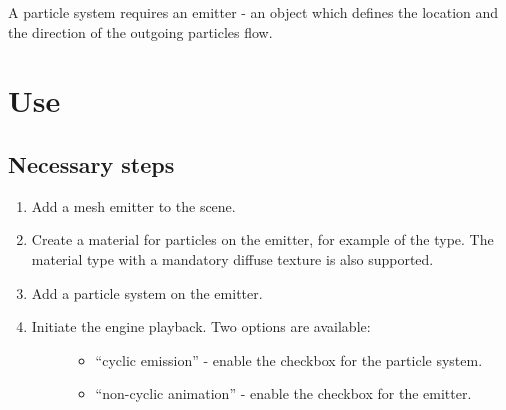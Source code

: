 \documentclass[a4paper,12pt,oneside]{sphinxmanual}
\begin{document}
A particle system requires an emitter - an object which defines the location and the direction of the outgoing particles flow.


\section{Use}
\label{particles:id2}

\subsection{Necessary steps}
\label{particles:id3}\begin{enumerate}
\item {} 
Add a mesh emitter to the scene.

\item {} 
Create a material for particles on the emitter, for example of the  type. The  material type with a mandatory diffuse texture is also supported.

\item {} 
Add a particle system on the emitter.

\item {} \begin{description}
\item[{Initiate the engine playback. Two options are available:}] \leavevmode\begin{itemize}
\item {} 
``cyclic emission'' - enable the  checkbox for the particle system.

\item {} 
``non-cyclic animation'' - enable the  checkbox for the emitter.

\end{itemize}

\end{description}

\end{enumerate}
\end{document}
